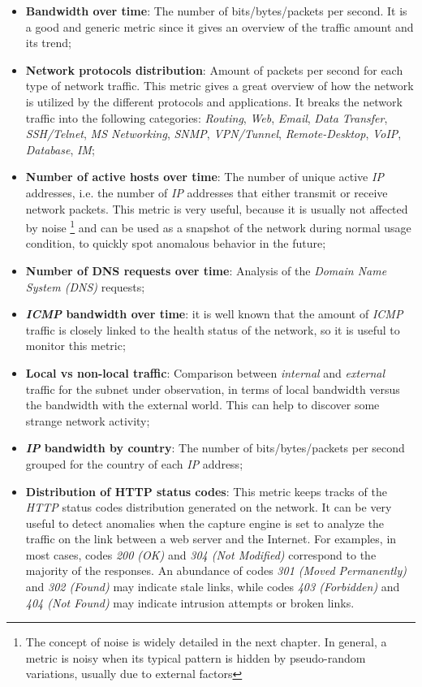\documentclass[12pt,a4paper,cucitura]{toptesi}
\begin{document}
\begin{itemize}
\item \textbf{Bandwidth over time}: The number of bits/bytes/packets per second. It is a good and generic metric since it gives an overview of the traffic amount and its trend;
\item \textbf{Network protocols distribution}: Amount of packets per second for each type of network traffic. This metric gives a great overview of how the network is utilized by the different protocols and applications. It breaks the network traffic into the following categories: \emph{Routing}, \emph{Web}, \emph{Email}, \emph{Data Transfer}, \emph{SSH/Telnet}, \emph{MS Networking}, \emph{SNMP}, \emph{VPN/Tunnel}, \emph{Remote-Desktop}, \emph{VoIP}, \emph{Database}, \emph{IM};
\item \textbf{Number of active hosts over time}: The number of unique active \emph{IP} addresses, i.e. the number of \emph{IP} addresses that either transmit or receive network packets. This metric is very useful, because it is usually not affected by noise \footnote{The concept of noise is widely detailed in the next chapter. In general, a metric is noisy when its typical pattern is hidden by pseudo-random variations, usually due to external factors} and can be used as a snapshot of the network during normal usage condition, to quickly spot anomalous behavior in the future;
\item \textbf{Number of DNS requests over time}: Analysis of the \emph{Domain Name System (DNS)} requests;
\item \textbf{\emph{ICMP} bandwidth over time}: it is well known that the amount of \emph{ICMP} traffic is closely linked to the health status of the network, so it is useful to monitor this metric;
\item \textbf{Local vs non-local traffic}: Comparison between \emph{internal} and \emph{external} traffic for the subnet under observation, in terms of local bandwidth versus the bandwidth with the external world. This can help to discover some strange network activity;
\item \textbf{\emph{IP} bandwidth by country}: The number of bits/bytes/packets per second grouped for the country of each \emph{IP} address;
\item \textbf{Distribution of HTTP status codes}: This metric keeps tracks of the \emph{HTTP} status codes distribution generated on the network. It can be very useful to detect anomalies when the capture engine is set to analyze the traffic on the link between a web server and the Internet. For examples, in most cases, codes \emph{200 (OK)} and \emph{304 (Not Modified)} correspond to the majority of the responses. An abundance of codes \emph{301 (Moved Permanently)} and \emph{302 (Found)} may indicate stale links, while codes \emph{403 (Forbidden)} and \emph{404 (Not Found)} may indicate intrusion attempts or broken links.

\end{itemize}
\end{document}

